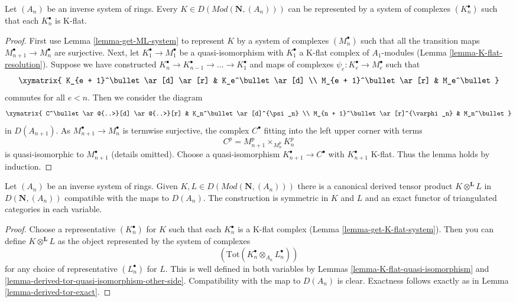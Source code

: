 \begin{lemma}
\label{lemma-get-K-flat-system}
Let $(A_n)$ be an inverse system of rings. Every
$K \in D(\textit{Mod}(\mathbf{N}, (A_n)))$
can be represented by a system of complexes $(K_n^\bullet)$
such that each $K_n^\bullet$ is K-flat.
\end{lemma}

\begin{proof}
First use Lemma \ref{lemma-get-ML-system} to represent $K$ by a
system of complexes $(M_n^\bullet)$ such that all the transition maps
$M_{n + 1}^\bullet \to M_n^\bullet$ are surjective.
Next, let $K_1^\bullet \to M_1^\bullet$ be a quasi-isomorphism
with $K_1^\bullet$ a K-flat complex of $A_1$-modules
(Lemma \ref{lemma-K-flat-resolution}).
Suppose we have constructed
$K_n^\bullet \to K_{n - 1}^\bullet \to \ldots \to K_1^\bullet$
and maps of complexes $\psi_e : K_e^\bullet \to M_e^\bullet$ such that
$$
\xymatrix{
K_{e + 1}^\bullet \ar[d] \ar[r] & K_e^\bullet \ar[d] \\
M_{e + 1}^\bullet \ar[r] & M_e^\bullet
}
$$
commutes for all $e < n$. Then we consider the diagram
$$
\xymatrix{
C^\bullet \ar@{..>}[d] \ar@{..>}[r] & K_n^\bullet \ar[d]^{\psi_n} \\
M_{n + 1}^\bullet \ar[r]^{\varphi_n} & M_n^\bullet
}
$$
in $D(A_{n + 1})$. As $M_{n + 1}^\bullet \to M_n^\bullet$ is
termwise surjective, the complex $C^\bullet$ fitting into the left
upper corner with terms
$$
C^p = M_{n + 1}^p \times_{M_n^p} K_n^p
$$
is quasi-isomorphic to $M_{n + 1}^\bullet$ (details omitted).
Choose a quasi-isomorphism $K_{n + 1}^\bullet \to C^\bullet$
with $K_{n +1}^\bullet$ K-flat.
Thus the lemma holds by induction.
\end{proof}

\begin{lemma}
\label{lemma-derived-tensor-product-systems}
Let $(A_n)$ be an inverse system of rings. Given
$K, L \in D(\textit{Mod}(\mathbf{N}, (A_n)))$ there is a canonical derived
tensor product $K \otimes^\mathbf{L} L$ in $D(\mathbf{N}, (A_n))$
compatible with the maps to $D(A_n)$. The construction is symmetric
in $K$ and $L$ and an exact functor of triangulated categories in
each variable.
\end{lemma}

\begin{proof}
Choose a representative $(K_n^\bullet)$ for $K$ such that each $K_n^\bullet$
is a K-flat complex (Lemma \ref{lemma-get-K-flat-system}).
Then you can define $K \otimes^\mathbf{L} L$ as the object represented by
the system of complexes
$$
(\text{Tot}(K_n^\bullet \otimes_{A_n} L_n^\bullet))
$$
for any choice of representative $(L_n^\bullet)$ for $L$.
This is well defined in both variables by
Lemmas \ref{lemma-K-flat-quasi-isomorphism} and
\ref{lemma-derived-tor-quasi-isomorphism-other-side}.
Compatibility with the map to $D(A_n)$ is clear.
Exactness follows exactly as in
Lemma \ref{lemma-derived-tor-exact}.
\end{proof}

